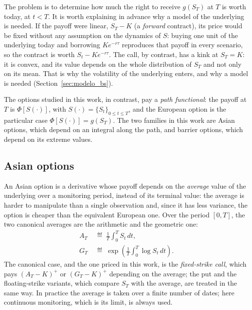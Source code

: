 The problem is to determine how much the right to receive $g(S_T)$ at
$T$ is worth today, at $t < T$. It is worth explaining in advance why a
model of the underlying is needed. If the payoff were linear, $S_T - K$
(a \emph{forward} contract), its price would be fixed without any
assumption on the dynamics of $S$: buying one unit of the underlying
today and borrowing $K e^{-r\tau}$ reproduces that payoff in every
scenario, so the contract is worth $S_t - K e^{-r\tau}$. The call, by
contrast, has a kink at $S_T = K$: it is convex, and its value depends
on the whole distribution of $S_T$ and not only on its mean. That is why
the volatility of the underlying enters, and why a model is needed
(Section~\ref{sec:modelo_bs}).

The options studied in this work, in contrast, pay a \emph{path
functional}: the payoff at $T$ is $\Phi[S(\cdot)]$, with
$S(\cdot) = \{S_t\}_{0 \leq t \leq T}$, and the European option is the
particular case $\Phi[S(\cdot)] = g(S_T)$. The two families in this work
are Asian options, which depend on an integral along the path, and
barrier options, which depend on its extreme values.

\subsection{Asian options}
\label{subsec:asian_concepto}\label{sec:asian_definicion}
\label{subsec:asian_promedios}

An Asian option is a derivative whose payoff depends on the
\emph{average} value of the underlying over a monitoring period, instead
of its terminal value: the average is harder to manipulate than a single
observation and, since it has less variance, the option is cheaper than
the equivalent European one. Over the period $[0, T]$, the two canonical
averages are the arithmetic and the geometric one:
\begin{align}
  A_T &\;\eqdef\; \frac{1}{T}\int_0^T S_t\, dt,
  \label{eq:promedio_aritmetico}\\
  G_T &\;\eqdef\; \exp\!\left(\frac{1}{T}\int_0^T \log S_t\, dt\right).
  \label{eq:promedio_geometrico}
\end{align}
The canonical case, and the one priced in this work, is the
\emph{fixed-strike call}, which pays $(A_T - K)^+$ or $(G_T - K)^+$
depending on the average; the put and the floating-strike variants,
which compare $S_T$ with the average, are treated in the same way. In
practice the average is taken over a finite number of dates; here
continuous monitoring, which is its limit, is always used.

